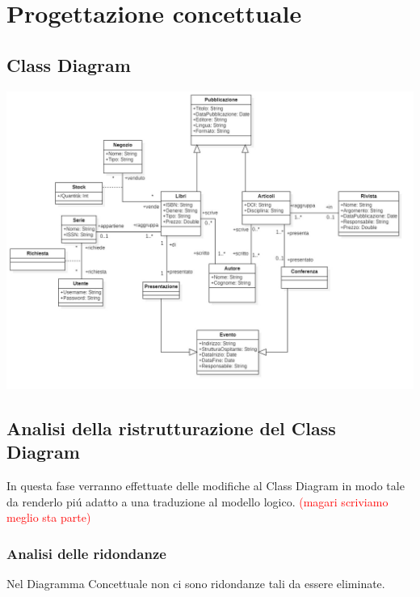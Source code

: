 \chapter{Progettazione concettuale}
    \section{Class Diagram}

    \includegraphics[scale=0.22]{Immagini/SchemaConcettuale.png}
        
    \section{Analisi della ristrutturazione del Class Diagram}
        In questa fase verranno effettuate delle modifiche al Class Diagram in modo tale da renderlo
        pi\'u adatto a una traduzione al modello logico. \textcolor{red}{(magari scriviamo meglio sta parte)}
        \subsection{Analisi delle ridondanze}
        Nel Diagramma Concettuale non ci sono ridondanze tali da essere eliminate.
